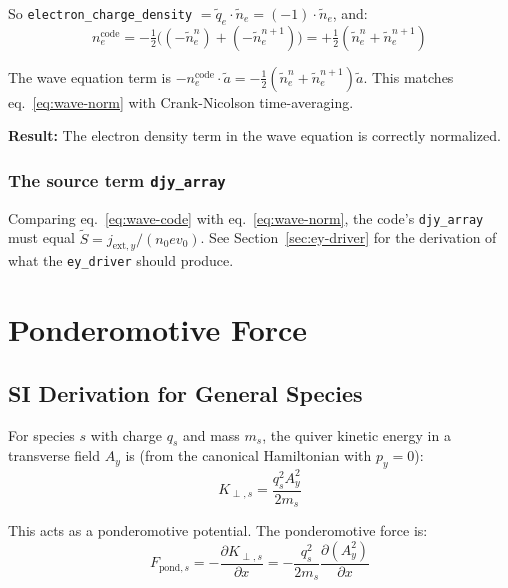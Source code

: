 \documentclass[11pt]{article}
\newcommand{\tl}[1]{\tilde{#1}}
\newcommand{\code}[1]{\texttt{#1}}
\newcommand{\tq}{\tl{q}}
\begin{document}
So \code{electron\_charge\_density} $= \tq_e \cdot \tl{n}_e = (-1) \cdot \tl{n}_e$, and:
\begin{equation}
    n_e^{\text{code}} = -\tfrac{1}{2}\bigl((-\tl{n}_e^n) + (-\tl{n}_e^{n+1})\bigr) = +\tfrac{1}{2}(\tl{n}_e^n + \tl{n}_e^{n+1})
\end{equation}

The wave equation term is $-n_e^{\text{code}} \cdot \tl{a} = -\frac{1}{2}(\tl{n}_e^n + \tl{n}_e^{n+1}) \tl{a}$. This matches eq.~\eqref{eq:wave-norm} with Crank-Nicolson time-averaging.

\begin{center}
\colorbox{green!15}{\parbox{0.85\textwidth}{
\textbf{Result:} The electron density term in the wave equation is correctly normalized.
}}
\end{center}

\subsubsection{The source term \code{djy\_array}}

Comparing eq.~\eqref{eq:wave-code} with eq.~\eqref{eq:wave-norm}, the code's \code{djy\_array} must equal $\tl{S} = j_{\text{ext},y}/(n_0 e v_0)$. See Section~\ref{sec:ey-driver} for the derivation of what the \code{ey\_driver} should produce.

\newpage
\section{Ponderomotive Force}
\label{sec:pond}

\subsection{SI Derivation for General Species}

For species $s$ with charge $q_s$ and mass $m_s$, the quiver kinetic energy in a transverse field $A_y$ is (from the canonical Hamiltonian with $p_y = 0$):
\begin{equation}
    K_{\perp,s} = \frac{q_s^2 A_y^2}{2 m_s}
\end{equation}

This acts as a ponderomotive potential. The ponderomotive force is:
\begin{equation}
    F_{\text{pond},s} = -\frac{\partial K_{\perp,s}}{\partial x} = -\frac{q_s^2}{2m_s} \frac{\partial (A_y^2)}{\partial x}
    \label{eq:pond-SI}
\end{equation}
\end{document}
